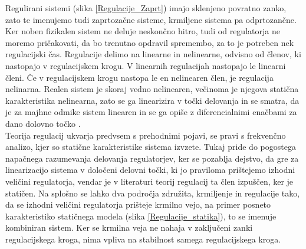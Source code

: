 \documentclass[a4paper,twoside,openright,12pt]{book}
\begin{document}
Regulirani sistemi (slika \ref{Regulacije_Zaprt}) imajo sklenjeno povratno zanko, zato te imenujemo
tudi zaprtozačne sisteme, krmiljene sistema pa odprtozančne. Ker noben fizikalen sistem ne deluje neskončno hitro, tudi od regulatorja ne moremo pričakovati, da bo trenutno opdravil spremembo, za to je potreben nek regulacijski čas. Regulacije delimo na linearne in nelinearne, odvisno od  členov, ki nastopajo v regulacijskem krogu. V linearnih regulacijah nastopajo le linearni členi. Če v regulacijskem krogu nastopa le en nelinearen člen, je regulacija nelinarna. Realen sistem je skoraj vedno nelinearen, večinoma je njegova statična karakteristika nelinearna, zato se ga linearizira v točki delovanja in se smatra, da je za majhne odmike sistem linearen in se ga opiše z diferencialnimi enačbami za dano dolovno točko \cite{Cajhen1990regulacije}.\\ 
Teorija regulacij ukvarja predvsem s prehodnimi pojavi, se pravi s frekvenčno analizo, kjer so statične karakteristike sistema izvzete. Tukaj pride do pogostega napačnega razumevanja delovanja regulatorjev, ker se pozablja dejstvo, da gre za linearizacijo sistema v določeni delovni točki, ki jo praviloma prištejemo izhodni veličini regulatorja, vendar je v literaturi teorij regulacij ta člen izpuščen, ker je statičen. Na splošno se lahko dva področja združita, krmiljenje in regulacije tako, da se izhodni veličini regulatorja prišteje krmilno vejo, na primer posneto karakteristiko statičnega modela (slika \ref{Regulacije_statika}), to se imenuje kombiniran sistem. Ker se krmilna veja ne nahaja v zaključeni zanki regulacijskega kroga, nima vpliva na stabilnost samega regulacijskega kroga.\\ 
\end{document}
